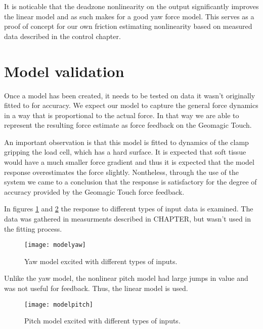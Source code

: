 It is noticable that the deadzone nonlinearity on the output significantly improves the linear model and as such makes for a good yaw force model.
This serves as a proof of concept for our own friction estimating nonlinearity based on measured data described in the control chapter.

\section{Model validation}
Once a model has been created, it needs to be tested on data it wasn't originally fitted to for accuracy.
We expect our model to capture the general force dynamics in a way that is proportional to the actual force.
In that way we are able to represent the resulting force estimate as force feedback on the Geomagic Touch.

An important observation is that this model is fitted to dynamics of the clamp gripping the load cell, which has a hard surface.
It is expected that soft tissue would have a much smaller force gradient and thus it is expected that the model response overestimates the force slightly.
Nontheless, through the use of the system we came to a conclusion that the response is satisfactory for the degree of accuracy provided by the Geomagic Touch force feedback.

In figures \ref{fig:final_res_yaw} and \ref{fig:final_res_pitch} the response to different types of input data is examined.
The data was gathered in measurments described in CHAPTER, but wasn't used in the fitting process.


\begin{figure}[H]
\centering
\texttt{[image: modelyaw]}
\caption{Yaw model excited with different types of inputs.}
\label{fig:final_res_yaw}
\end{figure}

Unlike the yaw model, the nonlinear pitch model had large jumps in value and was not useful for feedback.
Thus, the linear model is used.

\begin{figure}[H]
\centering
\texttt{[image: modelpitch]}
\caption{Pitch model excited with different types of inputs.}
\label{fig:final_res_pitch}
\end{figure}
